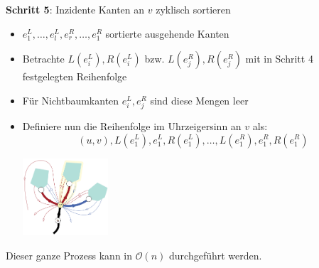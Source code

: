\textbf{Schritt 5}: Inzidente Kanten an $v$ zyklisch sortieren
\begin{itemize}
	\item $e_1^L,\ldots,e_l^L,e_r^R,\ldots,e_1^R$ sortierte ausgehende Kanten
	\item Betrachte $L(e_i^L), R(e_i^L)$ bzw. $L(e_j^R), R(e_j^R)$ mit in Schritt 4 festgelegten Reihenfolge
	\item Für Nichtbaumkanten $e_i^L,e_j^R$ sind diese Mengen leer
	\item Definiere nun die Reihenfolge im Uhrzeigersinn an $v$ als:
	$$(u,v),L(e_1^L),e_1^L,R(e_1^L),\ldots,L(e_1^R),e_1^R,R(e_1^R)$$
	\begin{center}
		\includegraphics[width=0.25\textwidth]{images/lr-8.png}
	\end{center}
\end{itemize}

Dieser ganze Prozess kann in $\mathcal{O}(n)$ durchgeführt werden.